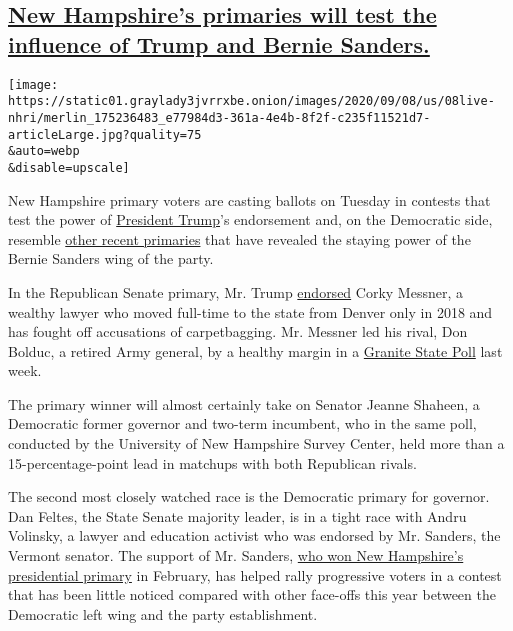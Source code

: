 \hypertarget{new-hampshires-primaries-will-test-the-influence-of-trump-and-bernie-sanders}{%
\subsection{\texorpdfstring{\protect\hyperlink{new-hampshires-primaries-will-test-the-influence-of-trump-and-bernie-sanders}{New
Hampshire's primaries will test the influence of Trump and Bernie
Sanders.}}{New Hampshire's primaries will test the influence of Trump and Bernie Sanders.}}\label{new-hampshires-primaries-will-test-the-influence-of-trump-and-bernie-sanders}}

\texttt{[image: https://static01.graylady3jvrrxbe.onion/images/2020/09/08/us/08live-nhri/merlin\_175236483\_e77984d3-361a-4e4b-8f2f-c235f11521d7-articleLarge.jpg?quality=75\\\&auto=webp\\\&disable=upscale]}

New Hampshire primary voters are casting ballots on Tuesday in contests
that test the power of
\href{https://www.nytimes3xbfgragh.onion/interactive/2020/us/elections/donald-trump.html}{President
Trump}'s endorsement and, on the Democratic side, resemble
\href{https://www.nytimes3xbfgragh.onion/2020/08/05/us/politics/election-primary-results.html}{other
recent primaries} that have revealed the staying power of the Bernie
Sanders wing of the party.

In the Republican Senate primary, Mr. Trump
\href{https://twitter.com/realDonaldTrump/status/1271482304716845057}{endorsed}
Corky Messner, a wealthy lawyer who moved full-time to the state from
Denver only in 2018 and has fought off accusations of carpetbagging. Mr.
Messner led his rival, Don Bolduc, a retired Army general, by a healthy
margin in a
\href{https://scholars.unh.edu/survey_center_polls/606/}{Granite State
Poll} last week.

The primary winner will almost certainly take on Senator Jeanne Shaheen,
a Democratic former governor and two-term incumbent, who in the same
poll, conducted by the University of New Hampshire Survey Center, held
more than a 15-percentage-point lead in matchups with both Republican
rivals.

The second most closely watched race is the Democratic primary for
governor. Dan Feltes, the State Senate majority leader, is in a tight
race with Andru Volinsky, a lawyer and education activist who was
endorsed by Mr. Sanders, the Vermont senator. The support of Mr.
Sanders,
\href{https://www.nytimes3xbfgragh.onion/2020/02/11/us/politics/bernie-sanders-new-hampshire-primary.html}{who
won New Hampshire's presidential primary} in February, has helped rally
progressive voters in a contest that has been little noticed compared
with other face-offs this year between the Democratic left wing and the
party establishment.


